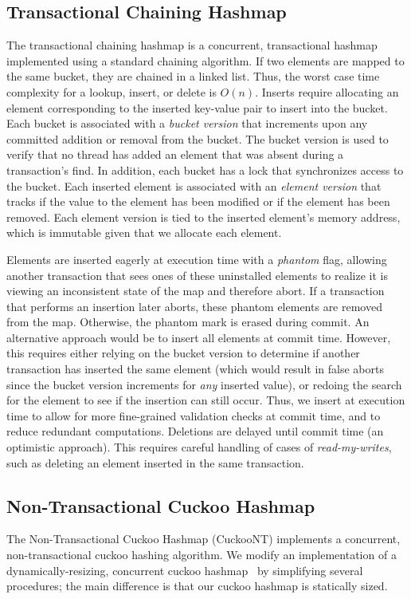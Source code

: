 \subsection{Transactional Chaining Hashmap}
The transactional chaining hashmap is a concurrent, transactional hashmap implemented using a standard chaining algorithm. If two elements are mapped to the same bucket, they are chained in a linked list. Thus, the worst case time complexity for a lookup, insert, or delete is $O(n)$. Inserts require allocating an element corresponding to the inserted key-value pair to insert into the bucket. Each bucket is associated with a \emph{bucket version} that increments upon any committed addition or removal from the bucket. The bucket version is used to verify that no thread has added an element that was absent during a transaction's find. In addition, each bucket has a lock that synchronizes access to the bucket. Each inserted element is associated with an \emph{element version} that tracks if the value to the element has been modified or if the element has been removed. Each element version is tied to the inserted element's memory address, which is immutable given that we allocate each element.

Elements are inserted eagerly at execution time with a \emph{phantom} flag, allowing another transaction that sees ones of these uninstalled elements to realize it is viewing an inconsistent state of the map and therefore abort. If a transaction that performs an insertion later aborts, these phantom elements are removed from the map. Otherwise, the phantom mark is erased during commit. An alternative approach would be to insert all elements at commit time. However, this requires either relying on the bucket version to determine if another transaction has inserted the same element (which would result in false aborts since the bucket version increments for \emph{any} inserted value), or redoing the search for the element to see if the insertion can still occur. Thus, we insert at execution time to allow for more fine-grained validation checks at commit time, and to reduce redundant computations. Deletions are delayed until commit time (an optimistic approach). This requires careful handling of cases of \emph{read-my-writes}, such as deleting an element inserted in the same transaction.

\subsection{Non-Transactional Cuckoo Hashmap}
\label{section:ntchm_algo}
The Non-Transactional Cuckoo Hashmap (CuckooNT) implements a concurrent, non-transactional cuckoo hashing algorithm. We modify an implementation of a dynamically-resizing, concurrent cuckoo hashmap~\cite{cuckoocode} by simplifying several procedures; the main difference is that our cuckoo hashmap is statically sized.

